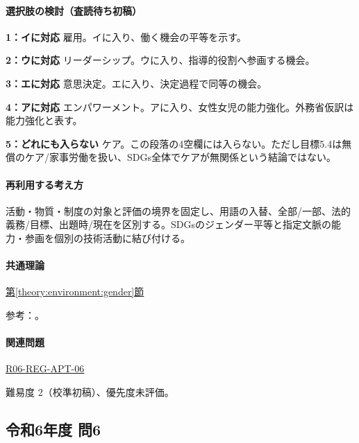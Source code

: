 \paragraph{選択肢の検討（査読待ち初稿）}\mbox{}\par

\noindent\textbf{1：イに対応} 雇用。イに入り、働く機会の平等を示す。\par

\noindent\textbf{2：ウに対応} リーダーシップ。ウに入り、指導的役割へ参画する機会。\par

\noindent\textbf{3：エに対応} 意思決定。エに入り、決定過程で同等の機会。\par

\noindent\textbf{4：アに対応} エンパワーメント。アに入り、女性女児の能力強化。外務省仮訳は能力強化と表す。\par

\noindent\textbf{5：どれにも入らない} ケア。この段落の4空欄には入らない。ただし目標5.4は無償のケア/家事労働を扱い、SDGs全体でケアが無関係という結論ではない。\par

\paragraph{再利用する考え方} 活動・物質・制度の対象と評価の境界を固定し、用語の入替、全部/一部、法的義務/目標、出題時/現在を区別する。SDGsのジェンダー平等と指定文脈の能力・参画を個別の技術活動に結び付ける。

\paragraph{共通理論} \hyperref[theory:environment:gender]{第\ref*{theory:environment:gender}節}

\par 参考：\cite{env_sdgs_agenda}。

\paragraph{関連問題} \hyperref[q:r06-reg-apt-06]{R06-REG-APT-06}

\par 難易度 2（校準初稿）、優先度未評価。

\subsection{令和6年度 問6}
\label{q:r06-reg-apt-06}

